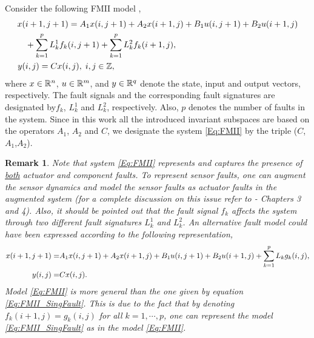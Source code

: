\documentclass[journal,12pt,draftcls,onecolumn]{IEEEtran}
\def\QEDclosed{\hfill\IEEEQEDclosed}
\renewcommand{\qed}{\QEDclosed}
\newtheorem{remark}{Remark}
\begin{document}
Consider the following FMII model \cite{FMinBook}, \begin{equation}\label{Eq:FMII}
	\begin{split}
		x(&i+1,j+1) = A_1x(i,j+1) + A_2x(i+1,j) + B_1u(i,j+1) + B_2u(i+1,j)\\&+
		\sum_{k=1}^p L_{k}^1 f_k(i,j+1) + \sum_{k=1}^p L_{k}^2 f_k(i+1,j),\\
		y(&i,j) = C x(i,j), \; i,j\in\mathbb{Z},
	\end{split}
\end{equation}
where $x\in\mathbb{R}^n$, $u\in\mathbb{R}^m$, and $y\in \mathbb{R}^q$ denote the state, input and output vectors, respectively. The fault signals and the corresponding fault signatures are designated by$f_k$, $L_k^1$ and $L_{k}^2$, respectively. Also, $p$ denotes the number of faults in the system. Since in this work all the introduced invariant subspaces are based on the operators $A_1$, $A_2$ and $C$, we designate the system \eqref{Eq:FMII} by the triple ($C$,$A_1$,$A_2$). \begin{remark}\label{Rem:onFMII-General}
	Note that system \eqref{Eq:FMII} represents and captures the presence of \underline{both} actuator and component faults. To represent sensor faults, one can augment the sensor dynamics and model the sensor faults as actuator faults in the augmented system (for a complete discussion on this issue refer to \cite{Mass_Thesis} - Chapters 3 and 4). Also, it should be pointed out that the fault signal $f_k$ affects the system through two different fault signatures $L_{k}^1$ and $L_{k}^2$. An alternative fault model could have been expressed according to the following representation,
	\begin{align}\label{Eq:FMII_SingFault}
x(i+1,j+1) = &A_1x(i,j+1) + A_2x(i+1,j) + B_1u(i,j+1) + B_2u(i+1,j)+
	\sum_{k=1}^p L_{k} g_{k}(i,j),\notag\\
	y(i,j) = &C x(i,j).
\end{align}
	Model \eqref{Eq:FMII} is more general than the one given by equation  \eqref{Eq:FMII_SingFault}. This is due to the fact that by denoting  $f_k(i+1,j) = g_k(i,j)$ for all $k = 1,\cdots,p$, one can represent the model \eqref{Eq:FMII_SingFault} as in the model \eqref{Eq:FMII}. \qed
\end{remark}
\end{document}
